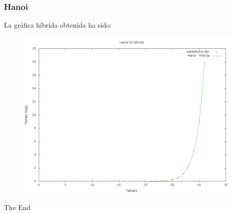 \documentclass{beamer}
\begin{document}
\begin{frame}
	\frametitle{Hanoi}
	La gráfica híbrida obtenida ha sido:
	\begin{figure}
		\centering
		\includegraphics[width=0.7\linewidth]{imagenes/hanoi-hibrido.png}
		\caption{}
		\label{fig:E5}
	\end{figure}
\end{frame}



\begin{frame}
\Huge{\centerline{The End}}
\end{frame}

\end{document}
